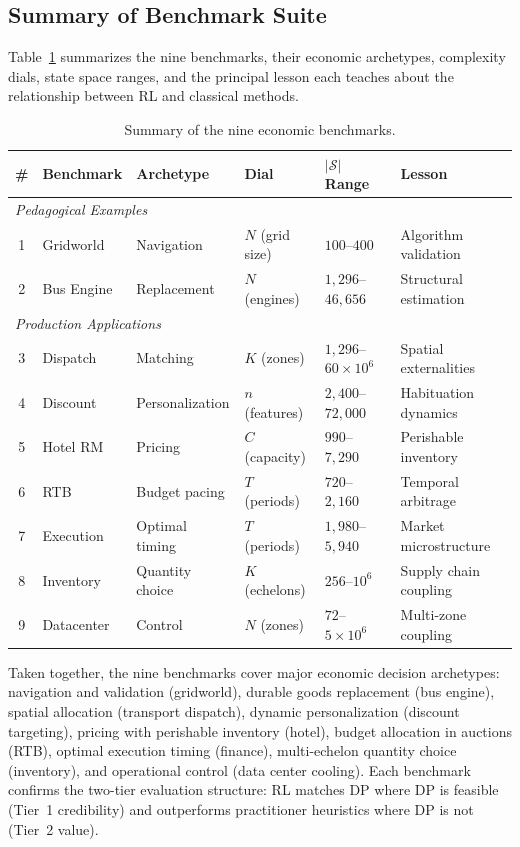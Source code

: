 \subsection{Summary of Benchmark Suite}
\label{sec:benchmark_summary}

Table~\ref{tab:benchmark_summary} summarizes the nine benchmarks, their economic archetypes, complexity dials, state space ranges, and the principal lesson each teaches about the relationship between RL and classical methods.

\begin{table}[htbp]
\centering
\caption{Summary of the nine economic benchmarks.}
\label{tab:benchmark_summary}
\begin{tabular}{clllll}
\toprule
\# & Benchmark & Archetype & Dial & $|\mathcal{S}|$ Range & Lesson \\
\midrule
\multicolumn{6}{l}{\emph{Pedagogical Examples}} \\
1 & Gridworld & Navigation & $N$ (grid size) & $100$--$400$ & Algorithm validation \\
2 & Bus Engine & Replacement & $N$ (engines) & $1{,}296$--$46{,}656$ & Structural estimation \\
\midrule
\multicolumn{6}{l}{\emph{Production Applications}} \\
3 & Dispatch & Matching & $K$ (zones) & $1{,}296$--$60 \times 10^6$ & Spatial externalities \\
4 & Discount & Personalization & $n$ (features) & $2{,}400$--$72{,}000$ & Habituation dynamics \\
5 & Hotel RM & Pricing & $C$ (capacity) & $990$--$7{,}290$ & Perishable inventory \\
6 & RTB & Budget pacing & $T$ (periods) & $720$--$2{,}160$ & Temporal arbitrage \\
7 & Execution & Optimal timing & $T$ (periods) & $1{,}980$--$5{,}940$ & Market microstructure \\
8 & Inventory & Quantity choice & $K$ (echelons) & $256$--$10^6$ & Supply chain coupling \\
9 & Datacenter & Control & $N$ (zones) & $72$--$5 \times 10^6$ & Multi-zone coupling \\
\bottomrule
\end{tabular}
\end{table}

Taken together, the nine benchmarks cover major economic decision archetypes: navigation and validation (gridworld), durable goods replacement (bus engine), spatial allocation (transport dispatch), dynamic personalization (discount targeting), pricing with perishable inventory (hotel), budget allocation in auctions (RTB), optimal execution timing (finance), multi-echelon quantity choice (inventory), and operational control (data center cooling). Each benchmark confirms the two-tier evaluation structure: RL matches DP where DP is feasible (Tier~1 credibility) and outperforms practitioner heuristics where DP is not (Tier~2 value).


